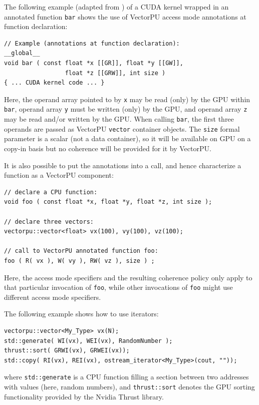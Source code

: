 The following example (adapted from \cite{VectorPU-2017}) 
of a CUDA kernel wrapped in an 
 annotated function \verb.bar. shows the use of 
VectorPU access mode annotations at function declaration:

{\footnotesize \begin{verbatim}
// Example (annotations at function declaration): 
__global__
void bar ( const float *x [[GR]], float *y [[GW]],
                 float *z [[GRW]], int size )
{ ... CUDA kernel code ... }
\end{verbatim}}

Here, the operand array pointed to by \verb.x. may be read (only) by the GPU within \verb.bar.,
operand array \verb.y. must be written (only) by the GPU, and 
operand array \verb.z. may be read and/or written by the GPU.
When calling \verb.bar., the
first three operands are  passed as VectorPU \verb.vector. 
container objects.
The \verb.size. formal parameter is a scalar (not a data container), so it
will be available on GPU on a copy-in basis but no coherence will
be provided for it by VectorPU.

It is also possible to put the annotations into a call, and hence characterize a function as a VectorPU component:


{\footnotesize \begin{verbatim}
// declare a CPU function:
void foo ( const float *x, float *y, float *z, int size );

// declare three vectors:
vectorpu::vector<float> vx(100), vy(100), vz(100);

// call to VectorPU annotated function foo:
foo ( R( vx ), W( vy ), RW( vz ), size ) ;
\end{verbatim}}

Here, the access mode specifiers and the resulting coherence policy
 only apply to that particular invocation of \verb-foo-, while other
invocations of \verb-foo- might use different access mode specifiers.

The following example shows how to use iterators:

{\footnotesize \begin{verbatim}
vectorpu::vector<My_Type> vx(N);
std::generate( WI(vx), WEI(vx), RandomNumber );
thrust::sort( GRWI(vx), GRWEI(vx));
std::copy( RI(vx), REI(vx), ostream_iterator<My_Type>(cout, ""));
\end{verbatim}}

\noindent 
where \verb.std::generate. is a CPU function filling a section between
two addresses with values (here, random numbers),
and \verb.thrust::sort. denotes the GPU sorting functionality
provided by the Nvidia Thrust library. 

